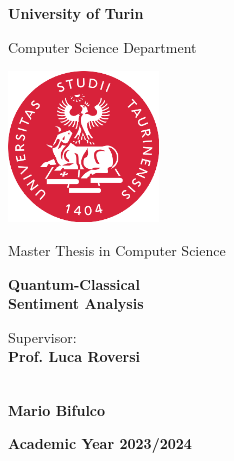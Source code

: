 \begin{center}
{\LARGE \textbf{University of Turin}}
\vspace{0.2cm}

{\Large {Computer Science Department}} 
\vspace{1cm}

\includegraphics[width=4cm]{figures/unito-logo.png}
\vspace{0.8cm}

{\Large {Master Thesis in Computer Science}}
\vspace{1cm}

{\LARGE \textbf{Quantum-Classical\\Sentiment Analysis}}
\vspace{1cm}

\end{center}

\noindent \large{Supervisor:} \\
\large{\textbf{Prof. Luca Roversi}} 
\vspace{1cm}



 \\
\large{\textbf{Mario Bifulco}} 

\vspace{2cm}

\begin{center}
    \large{\textbf{Academic Year 2023/2024}}
\end{center}


